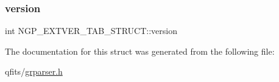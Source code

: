\subsubsection{\texorpdfstring{version}{version}}
{\footnotesize\ttfamily int N\+G\+P\+\_\+\+E\+X\+T\+V\+E\+R\+\_\+\+T\+A\+B\+\_\+\+S\+T\+R\+U\+C\+T\+::version}



The documentation for this struct was generated from the following file\+:\begin{DoxyCompactItemize}
\item 
qfits/\hyperlink{grparser_8h}{grparser.\+h}\end{DoxyCompactItemize}
